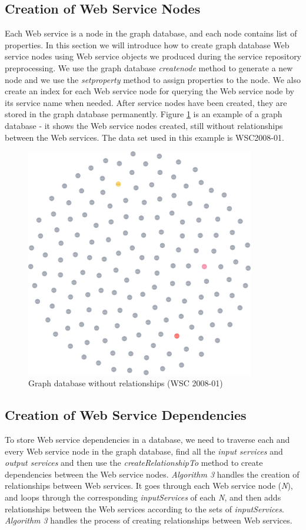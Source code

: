 \subsection{Creation of Web Service Nodes}
Each Web service is a node in the graph database, and each node contains list of properties. In this section we will introduce how to create graph database Web service nodes using Web service objects we produced during the service repository preprocessing. We use the graph database \emph{createnode} method to generate a new node and we use the \emph{setproperty} method to assign properties to the node. We also create an index for each Web service node for querying the Web service node by its service name when needed. After service nodes have been created, they are stored in the graph database permanently. Figure \ref{fig:noRelationships} is an example of a graph database - it shows the Web service nodes created, still without relationships between the Web services. The data set used in this example is WSC2008-01. 

\begin{figure}[H]
\includegraphics[width=10cm]{service-without-relationships.pdf}
\centering
\caption{Graph database without relationships (WSC 2008-01)}
\label{fig:noRelationships} 
\end{figure} 
\subsection {Creation of Web Service Dependencies}
To store Web service dependencies in a database,  we need to traverse each and every Web service node in the graph database, find all the \emph{input services} and \emph{output services} and then use the \emph{createRelationshipTo} method to create dependencies between the Web service nodes. \emph{Algorithm 3} handles the creation of relationships between Web services. It goes through each Web service node (\emph{N}), and loops through the corresponding \emph{inputServices} of each \emph{N}, and then adds relationships between the Web services according to the sets of  \emph{inputServices}. \emph{Algorithm 3} handles the process of creating relationships between Web services. 

